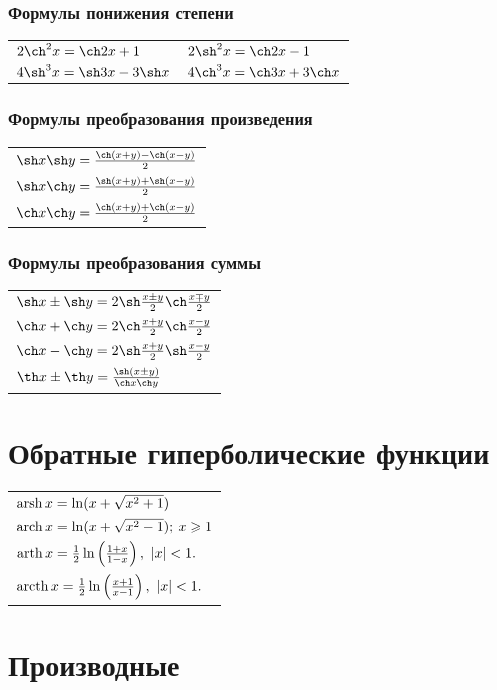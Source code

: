 \subsubsection{Формулы понижения степени}
\begin{tabular}{l l}
$2\ch^2 x = \ch 2x + 1$
&
$2\sh^2 x = \ch 2x - 1$
\\
$4\sh^3 x = \sh 3x - 3 \sh x$
&
$4 \ch^3 x = \ch 3x + 3 \ch x$
\end{tabular}

\subsubsection{Формулы преобразования произведения}
\begin{tabular}{l}
$\sh x \sh y = \frac{\ch(x + y) - \ch (x - y)}{2}$
\\
$\sh x \ch y = \frac{\sh(x + y) + \sh(x - y)}{2}$
\\
$\ch x \ch y = \frac{\ch(x + y) + \ch(x - y)}{2}$
\end{tabular}

\subsubsection{Формулы преобразования суммы}
\begin{tabular}{l}
$\sh x \pm \sh y = 2 \sh\frac{x \pm y}{2} \ch\frac{x \mp y}{2}$
\\
$\ch x + \ch y = 2 \ch\frac{x + y}{2}\ch\frac{x - y}{2}$
\\
$\ch x - \ch y = 2 \sh\frac{x + y}{2}\sh\frac{x - y}{2}$
\\
$\th x \pm \th y = \frac{\sh(x \pm y)}{\ch x \ch y}$
\end{tabular}

\section{Обратные гиперболические функции}

\begin{tabular}{l}
$\operatorname{arsh} x = \ln(x + \sqrt{x^2 + 1})$
\\
$\operatorname{arch} x = \ln(x + \sqrt{x^2 - 1}); \: x \geqslant 1$
\\
$\arth x = \frac{1}{2}\ln \left(\frac{1 + x}{1 - x} \right),\ |x|<1.$
\\
$\arcth x = \frac{1}{2}\ln \left( \frac{x+ 1}{x - 1} \right),\ |x|<1.$
\end{tabular}

\section{Производные}


